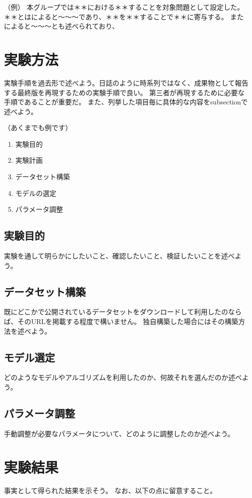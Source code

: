 \documentclass[a4paper, 11pt, titlepage]{jsarticle}
\begin{document}
（例）
本グループでは＊＊における＊＊することを対象問題として設定した。
＊＊とは\cite{theme1}によると〜〜〜であり、＊＊を＊＊することで＊＊に寄与する。
また\cite{theme2}によると〜〜〜とも述べられており、

\section{実験方法}
実験手順を過去形で述べよう。日誌のように時系列ではなく、成果物として報告する最終版を再現するための実験手順で良い。
第三者が再現するために必要な手順であることが重要だ。
また、列挙した項目毎に具体的な内容をsubsectionで述べよう。

（あくまでも例です）
\begin{enumerate}
 \item 実験目的
 \item 実験計画
 \item データセット構築
 \item モデルの選定
 \item パラメータ調整
\end{enumerate}

\subsection{実験目的}
実験を通して明らかにしたいこと、確認したいこと、検証したいことを述べよう。

\subsection{データセット構築}
既にどこかで公開されているデータセットをダウンロードして利用したのならば、そのURLを掲載する程度で構いません。
独自構築した場合にはその構築方法を述べよう。

\subsection{モデル選定}
どのようなモデルやアルゴリズムを利用したのか、何故それを選んだのか述べよう。

\subsection{パラメータ調整}
手動調整が必要なパラメータについて、どのように調整したのか述べよう。


\section{実験結果}
事実として得られた結果を示そう。
なお、以下の点に留意すること。
\end{document}
